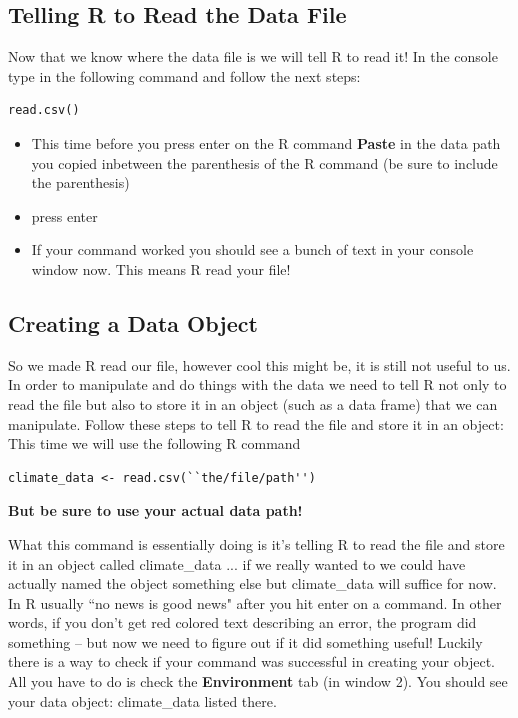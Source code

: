 \documentclass{article}\usepackage[]{graphicx}\usepackage[]{color}
\begin{document}
\subsection{Telling R to Read the Data File}

Now that we know where the data file is we will tell R to read it! In the console type in the following command and follow the next steps: 
\begin{verbatim}
read.csv()
\end{verbatim}

\begin{itemize}
\item This time before you press enter on the R command \textbf{Paste} in the data path you copied inbetween the parenthesis of the R command (be sure to include the parenthesis)
\item press enter
\item If your command worked you should see a bunch of text in your console window now. This means R read your file!
\end{itemize}

\subsection{Creating a Data Object}
So we made R read our file, however cool this might be, it is still not useful to us. In order to manipulate and do things with the data we need to tell R not only to read the file but also to store it in an object (such as a data frame) that we can manipulate. Follow these steps to tell R to read the file and store it in an object: \\

This time we will use the following R command\\
\begin{verbatim}
climate_data <- read.csv(``the/file/path'')
\end{verbatim}

\textbf{But be sure to use your actual data path!}

What this command is essentially doing is it's telling R to read the file and store it in an object called climate\_data ... if we really wanted to we could have actually named the object something else but climate\_data will suffice for now. \\ 

In R usually ``no news is good news" after you hit enter on a command. In other words, if you don't get red colored text describing an error, the program did something -- but now we need to figure out if it did something useful! Luckily there is a way to check if your command was successful in creating your object. All you have to do is check the \textbf{Environment} tab (in window 2). You should see your data object: climate\_data listed there. 
\end{document}
